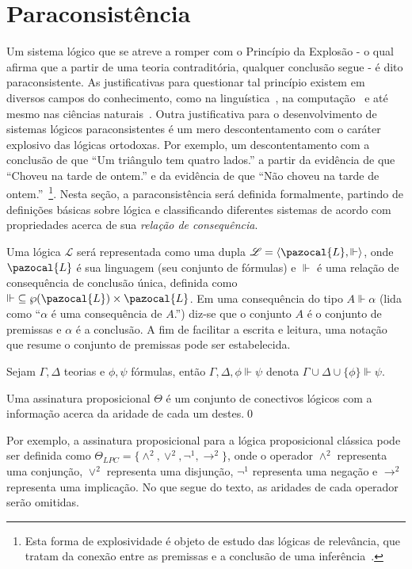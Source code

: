 \section{Paraconsistência}
\label{sec:paracons}
Um sistema lógico que se atreve a romper com o Princípio da Explosão {-} o qual afirma que a partir de uma teoria contraditória, qualquer conclusão segue {-} é dito paraconsistente. As justificativas para questionar tal princípio existem em diversos campos do conhecimento, como na linguística~\cite{McGinnis2013-MCGTUA}, na computação~\cite{carnielli2000formal} e até mesmo nas ciências naturais~\cite{Brown2015-BROCAP-9}. Outra justificativa para o desenvolvimento de sistemas lógicos paraconsistentes é um mero descontentamento com o caráter explosivo das lógicas ortodoxas. Por exemplo, um descontentamento com a conclusão de que ``Um triângulo tem quatro lados.'' a partir da evidência de que ``Choveu na tarde de ontem.'' e da evidência de que ``Não choveu na tarde de ontem.''~\footnote{Esta forma de explosividade é objeto de estudo das lógicas de relevância, que tratam da conexão entre as premissas e a conclusão de uma inferência~\cite{sep-logic-relevance}.}. Nesta seção, a paraconsistência será definida formalmente, partindo de definições básicas sobre lógica e classificando diferentes sistemas de acordo com propriedades acerca de sua \textit{relação de consequência}.

Uma lógica $\mathcal{L}$ será representada como uma dupla $\mathcal{L} = \langle \pazocal{L},\Vdash \rangle$, onde $\pazocal{L}$ é sua linguagem (seu conjunto de fórmulas) e $\Vdash$ é uma relação de consequência de conclusão única, definida como $\Vdash \;\subseteq \wp(\pazocal{L})\times\pazocal{L}$. Em uma consequência do tipo $A \Vdash \alpha$ (lida como ``$\alpha$ é uma consequência de $A$.'') diz-se que o conjunto $A$ é o conjunto de premissas e $\alpha$ é a conclusão. A fim de facilitar a escrita e leitura, uma notação que resume o conjunto de premissas pode ser estabelecida.

\begin{notacao}
    Sejam $\Gamma, \Delta$ teorias e $\phi, \psi$ fórmulas, então $\Gamma, \Delta, \phi \Vdash \psi$ denota $\Gamma \cup \Delta \cup \{\phi\} \Vdash \psi$.
\end{notacao}

\begin{definicao}
    \label{def:ass_prop}
    Uma assinatura proposicional $\Theta$ é um conjunto de conectivos lógicos com a informação acerca da aridade de cada um destes.\qed{}
\end{definicao}
Por exemplo, a assinatura proposicional para a lógica proposicional clássica pode ser definida como $\Theta_{LPC} = \{\land^{2}, \lor^{2}, \neg^{1}, \rightarrow^{2}\}$, onde o operador $\land^{2}$ representa uma conjunção, $\lor^{2}$ representa uma disjunção, $\neg^{1}$ representa uma negação e $\rightarrow^{2}$ representa uma implicação. No que segue do texto, as aridades de cada operador serão omitidas.

